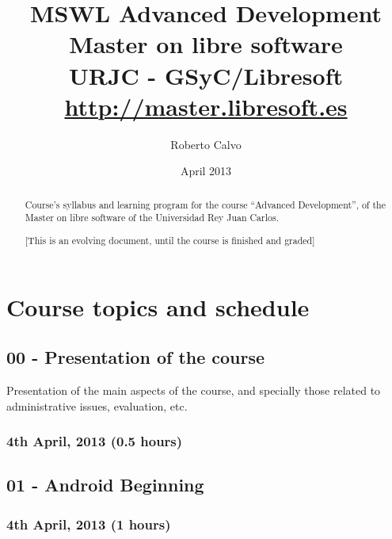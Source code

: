 \documentclass[a4paper]{article}
\title{MSWL Advanced Development \\
Master on libre software \\
URJC - GSyC/Libresoft \\
\url{http://master.libresoft.es}}
\author{Roberto Calvo}
\date{April 2013}
\begin{document}
\maketitle

\begin{abstract}
Course's syllabus and learning program for the course ``Advanced
Development'', of the Master on libre software of the Universidad Rey
Juan Carlos.


[This is an evolving document, until the course is finished and graded]
\end{abstract}

\tableofcontents

\section{Course topics and schedule}

\subsection{00 - Presentation of the course}

Presentation of the main aspects of the course, and specially those
related to administrative issues, evaluation, etc.

\subsubsection{4th April, 2013 (0.5 hours)}


\subsection{01 - Android Beginning}


\subsubsection{4th April, 2013 (1 hours)}
\end{document}
